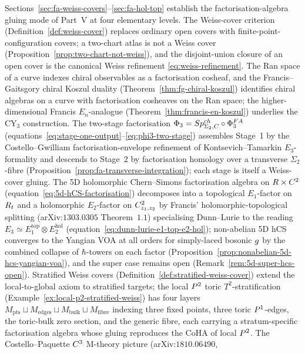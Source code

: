 Sections~\ref{sec:fa-weiss-covers}--\ref{sec:fa-hol-top} establish the
factorisation-algebra gluing mode of Part~V at four elementary levels.
The Weiss-cover criterion (Definition~\ref{def:weiss-cover}) replaces
ordinary open covers with finite-point-configuration covers; a
two-chart atlas is not a Weiss cover
(Proposition~\ref{prop:two-chart-not-weiss}), and the disjoint-union
closure of an open cover is the canonical Weiss refinement
\eqref{eq:weiss-refinement}. The Ran space of a curve indexes chiral
observables as a factorisation cosheaf, and the Francis--Gaitsgory
chiral Koszul duality (Theorem~\ref{thm:fg-chiral-koszul}) identifies
chiral algebras on a curve with factorisation cosheaves on the Ran
space; the higher-dimensional Francis $E_n$-analogue
(Theorem~\ref{thm:francis-en-koszul}) underlies the CY$_3$ construction.
The two-stage factorisation $\Phi_3 = Sp^{ch}_{\Sigma_2, C} \circ
\Phi^{FA}_3$ (equations~\eqref{eq:stage-one-output}--\eqref{eq:phi3-two-stage})
assembles Stage~1 by the Costello--Gwilliam factorisation-envelope
refinement of Kontsevich--Tamarkin $E_3$-formality and descends to
Stage~2 by factorisation homology over a transverse $\Sigma_2$-fibre
(Proposition~\ref{prop:fa-transverse-integration}); each stage is
itself a Weiss-cover gluing. The 5D holomorphic Chern--Simons
factorisation algebra on $R \times C^2$
(equation~\eqref{eq:5d-hCS-factorisation}) decomposes into a topological
$E_1$-factor on $R_t$ and a holomorphic $E_2$-factor on $C^2_{z_1, z_2}$
by Francis' holomorphic-topological splitting (arXiv:$1303.0305$
Theorem~$1.1$) specialising Dunn--Lurie to the reading
$E_3 \simeq E_1^{\mathrm{top}} \otimes E_2^{\mathrm{hol}}$
(equation~\eqref{eq:dunn-lurie-e1-top-e2-hol}); non-abelian 5D hCS
converges to the Yangian VOA at all orders for simply-laced bosonic
$g$ by the combined collapse of $\hbar$-towers on each factor
(Proposition~\ref{prop:nonabelian-5d-hcs-yangian-voa}), and the super
case remains open
(Remark~\ref{rem:5d-super-hcs-open}). Stratified
Weiss covers (Definition~\ref{def:stratified-weiss-cover}) extend the
local-to-global axiom to stratified targets; the local $P^2$ toric
$T^2$-stratification (Example~\ref{ex:local-p2-stratified-weiss}) has
four layers $M_{\mathrm{pts}} \sqcup M_{\mathrm{edges}} \sqcup
M_{\mathrm{bulk}} \sqcup M_{\mathrm{fibre}}$ indexing three fixed
points, three toric $P^1$-edges, the toric-bulk zero section, and
the generic fibre, each carrying a stratum-specific factorisation
algebra whose gluing reproduces the CoHA of local $P^2$. The
Costello--Paquette $C^3$ M-theory picture (arXiv:$1810.06490$,
